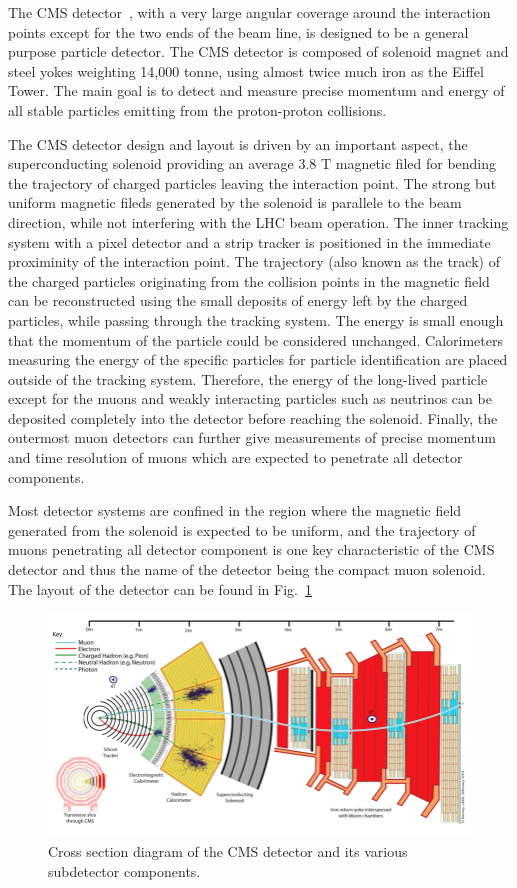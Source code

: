 The CMS detector~\cite{Chatrchyan:1129810}, with a very large angular coverage around the interaction points except for the two ends of the beam line, is designed to be a general purpose particle detector.
The CMS detector is composed of solenoid magnet and steel yokes weighting 14,000 tonne, using almost twice much iron as the Eiffel Tower.
The main goal is to detect and measure precise momentum and energy of all stable particles emitting from the proton-proton collisions.

The CMS detector design and layout is driven by an important aspect, the superconducting solenoid providing an average 3.8 T magnetic filed for bending the trajectory of charged particles leaving the interaction point.
The strong but uniform magnetic fileds generated by the solenoid is parallele to the beam direction, while not interfering with the LHC beam operation.
The inner tracking system with a pixel detector and a strip tracker is positioned in the immediate proximinity of the interaction point.
The trajectory (also known as the track) of the charged particles originating from the collision points in the magnetic field can be reconstructed using the small deposits of energy left by the charged particles, while passing through the tracking system.
The energy is small enough that the momentum of the particle could be considered unchanged.
Calorimeters measuring the energy of the specific particles for particle identification are placed outside of the tracking system.
Therefore, the energy of the long-lived particle except for the muons and weakly interacting particles such as neutrinos can be deposited completely into the detector before reaching the solenoid.
Finally, the outermost muon detectors can further give measurements of precise momentum and time resolution of muons which are expected to penetrate all detector components. 

Most detector systems are confined in the region where the magnetic field generated from the solenoid is expected to be uniform, and the trajectory of muons penetrating all detector component is one key characteristic of the CMS detector and thus the name of the detector being the compact muon solenoid.
The layout of the detector can be found in Fig.~\ref{fig:cms_layout}
\begin{figure}\centering
    \includegraphics[width=\textwidth]{figure/cms_layout.png}
    \caption{Cross section diagram of the CMS detector and its various subdetector components.}
    \label{fig:cms_layout}
\end{figure}


